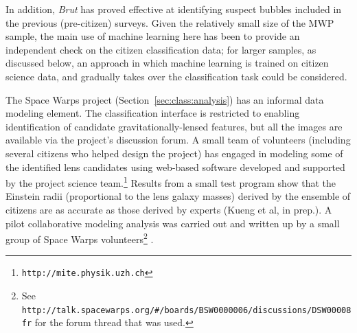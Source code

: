 \documentclass{ar2e}
\def\Sref#1{Section~\ref{#1}\xspace}
\def\CaseStudy#1{\noindent{\it\bf #1 \,\,\,\,}}
\def\url#1{\texttt{#1}}
\begin{document}
In addition, \textit{Brut} has proved effective at identifying suspect bubbles
included in the previous (pre-citizen) surveys. Given the relatively small size
of the MWP sample, the main use of machine learning here has been to provide an
independent check on the citizen classification data; for larger samples, as
discussed below, an approach in which machine learning is trained on citizen
science data, and gradually takes over the classification task could be
considered. 


\CaseStudy{Modelling Lens Candidates} 
The Space Warps project (\Sref{sec:class:analysis}) has an informal data
modeling element. The classification interface is restricted to enabling
identification of candidate gravitationally-lensed features, but all the images
are available via the project's discussion forum. A small team of volunteers
(including several citizens who helped design the project) has engaged in
modeling some of the identified lens candidates using web-based software
developed and supported by the project science
team.\footnote{\url{http://mite.physik.uzh.ch}} Results from a small test
program show that the Einstein radii (proportional to the lens galaxy masses) 
derived by the  ensemble of citizens are
as accurate as those derived by experts 
(Kueng et al, in prep.).
A pilot collaborative modeling analysis was carried out and written up by a
small group of Space Warps volunteers\footnote{See
\url{http://talk.spacewarps.org/\#/boards/BSW0000006/discussions/DSW00008fr} for
the forum thread that was used.} \citep{Wilcox2014}.


\end{document}
